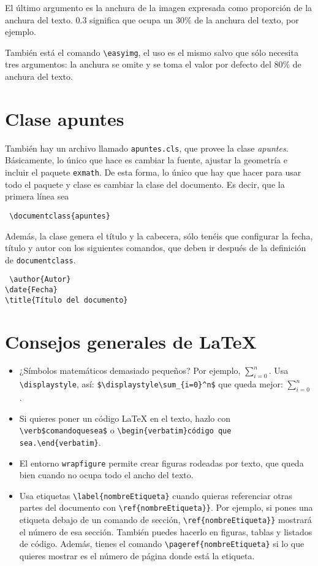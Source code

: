 \documentclass{apuntes}
\begin{document}
El último argumento es la anchura de la imagen expresada como proporción de la anchura del texto. $0.3$ significa que ocupa un $30\%$ de la anchura del texto, por ejemplo.


También está el comando \verb|\easyimg|, el uso es el mismo salvo que sólo necesita tres argumentos: la anchura se omite y se toma el valor por defecto del $80\%$ de anchura del texto. 
 
 \section{Clase apuntes}
 
 También hay un archivo llamado \texttt{apuntes.cls}, que provee la clase \textit{apuntes}. Básicamente, lo único que hace es cambiar la fuente, ajustar la geometría e incluir el paquete \texttt{exmath}. De esta forma, lo único que hay que hacer para usar todo el paquete y clase es cambiar la clase del documento. Es decir, que la primera línea sea 
 
 \begin{verbatim}
 \documentclass{apuntes}
 \end{verbatim}
 
 Además, la clase genera el título y la cabecera, sólo tenéis que configurar la fecha, título y autor con los siguientes comandos, que deben ir después de la definición de \texttt{documentclass}.
 
 \begin{verbatim}
 \author{Autor}
\date{Fecha}
\title{Título del documento}
 \end{verbatim}
 
\section{Consejos generales de \LaTeX}

\begin{itemize}
\item ¿Símbolos matemáticos demasiado pequeños? Por ejemplo, $\sum_{i=0}^n$. Usa \verb|\displaystyle|, así: \verb|$\displaystyle\sum_{i=0}^n$| que queda mejor: $\displaystyle\sum_{i=0}^n$.
\item Si quieres poner un código LaTeX en el texto, hazlo con \verb|\verb$comandoquesea$| o \verb|\begin{verbatim}código que sea.\end{verbatim}|.
\item El entorno \texttt{wrapfigure} permite crear figuras rodeadas por texto, que queda bien cuando no ocupa  todo el ancho del texto.
\item Usa etiquetas \verb|\label{nombreEtiqueta}| cuando quieras referenciar otras partes del documento con \verb|\ref{nombreEtiqueta}}|. Por ejemplo, si pones una etiqueta debajo de un comando de sección, \verb|\ref{nombreEtiqueta}}| mostrará el número de esa sección. También puedes hacerlo en figuras, tablas y listados de código. Además, tienes el comando \verb|\pageref{nombreEtiqueta}| si lo que quieres mostrar es el número de página donde está la etiqueta.
\end{itemize} 
\end{document}
